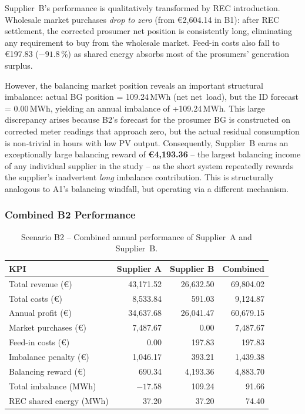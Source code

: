 Supplier~B's performance is qualitatively transformed by REC introduction.
Wholesale market purchases \emph{drop to zero} (from €2{,}604.14 in B1):
after REC settlement, the corrected prosumer net position is consistently
long, eliminating any requirement to buy from the wholesale market.
Feed-in costs also fall to €197.83 ($-91.8$\,\%) as shared energy absorbs
most of the prosumers' generation surplus.

However, the balancing market position reveals an important structural
imbalance: actual BG position = 109.24\,MWh (net net~load), but the ID
forecast = 0.00\,MWh, yielding an annual imbalance of +109.24\,MWh.
This large discrepancy arises because B2's forecast for the prosumer BG is
constructed on corrected meter readings that approach zero, but the actual
residual consumption is non-trivial in hours with low PV output.  Consequently,
Supplier~B earns an exceptionally large balancing reward of \textbf{€4{,}193.36}
-- the largest balancing income of any individual supplier in the study --
as the short system repeatedly rewards the supplier's inadvertent
\emph{long} imbalance contribution.  This is structurally analogous to A1's
balancing windfall, but operating via a different mechanism.

\subsubsection{Combined B2 Performance}

\begin{table}[htbp]
\centering
\caption{Scenario B2 -- Combined annual performance of Supplier~A and
         Supplier~B.}
\label{tab:B2_combined}
\renewcommand{\arraystretch}{1.3}
\begin{tabular}{@{}lrrr@{}}
\toprule
\textbf{KPI}           & \textbf{Supplier A}  & \textbf{Supplier B}  & \textbf{Combined} \\
\midrule
Total revenue (€)      & 43{,}171.52          & 26{,}632.50          & 69{,}804.02 \\
Total costs (€)        & 8{,}533.84           & 591.03               & 9{,}124.87  \\
Annual profit (€)      & 34{,}637.68          & 26{,}041.47          & 60{,}679.15 \\
Market purchases (€)   & 7{,}487.67           & 0.00                 & 7{,}487.67  \\
Feed-in costs (€)      & 0.00                 & 197.83               & 197.83      \\
Imbalance penalty (€)  & 1{,}046.17           & 393.21               & 1{,}439.38  \\
Balancing reward (€)   & 690.34               & 4{,}193.36           & 4{,}883.70  \\
Total imbalance (MWh)  & $-17.58$             & 109.24               & 91.66       \\
REC shared energy (MWh)& 37.20                & 37.20                & 74.40       \\
\bottomrule
\end{tabular}
\end{table}

